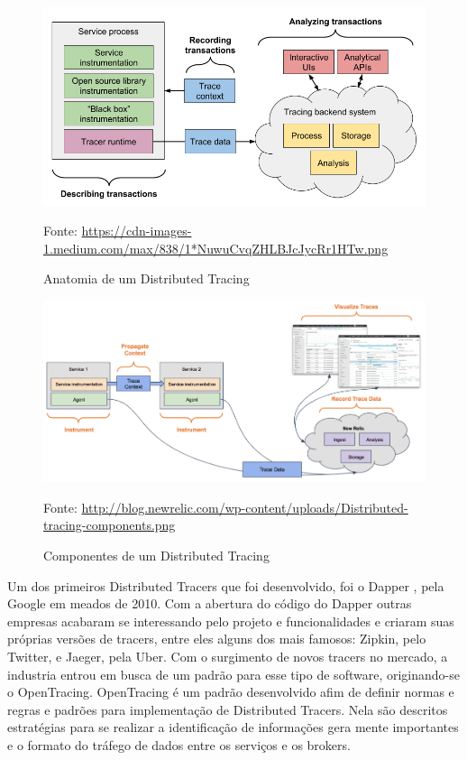 \documentclass[twosideprint]{politex}
\newcommand{\legend}[1]{\begin{center}\def\caption{}\caption{#1}\end{center}}
\begin{document}
	\begin{figure}[htb]
		\caption{\label{fig_tracing_concept}Anatomia de um Distributed Tracing}
		\begin{center}
		\includegraphics[scale=0.5]{pictures/tracing_concept.png}
		\end{center}
		\legend{Fonte: \url{https://cdn-images-1.medium.com/max/838/1*NuwuCvqZHLBJcJycRr1HTw.png}}
	\end{figure}
	
	\begin{figure}[htb]
		\caption{\label{fig_tracing_components}Componentes de um Distributed Tracing}
		\begin{center}
		\includegraphics[scale=1]{pictures/distributed-tracing-components.png}
		\end{center}
		\legend{Fonte: \url{http://blog.newrelic.com/wp-content/uploads/Distributed-tracing-components.png}}
	\end{figure}
	
	Um dos primeiros Distributed Tracers que foi desenvolvido, foi o Dapper \cite{googledapper}, pela Google em meados de 2010. Com a abertura do código do Dapper outras empresas acabaram se interessando pelo projeto e funcionalidades e criaram suas próprias versões de tracers, entre eles alguns dos mais famosos: Zipkin\cite{zipkin}, pelo Twitter, e Jaeger\cite{jaegerarch}, pela Uber. Com o surgimento de novos tracers no mercado, a industria entrou em busca de um padrão para esse tipo de software, originando-se o OpenTracing\cite{opentracing}. OpenTracing é um padrão desenvolvido afim de definir normas e regras e padrões para implementação de Distributed Tracers. Nela são descritos estratégias para se realizar a identificação de informações gera mente importantes e o formato do tráfego de dados entre os serviços e os brokers.
	
\end{document}
